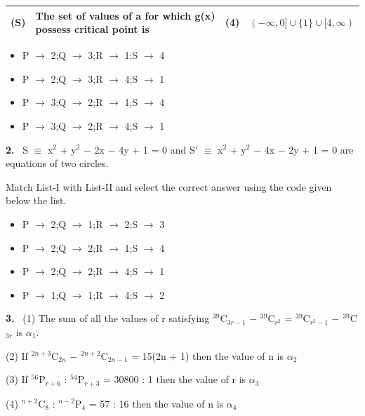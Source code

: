 \documentclass[10pt]{extarticle}
\newcommand{\qn}[1]{\par\smallskip\noindent\textbf{#1.}~}
\newenvironment{qoptions}{\begin{itemize}[leftmargin=1.8em,itemsep=1pt,topsep=2pt,label={}]}{\end{itemize}}
\newcommand{\opt}[2]{\item[(#1)] #2}
\begin{document}
\begin{multicols}{2}
{\begin{tabular}{|L{.7cm}|L{2.6cm}|L{.7cm}|L{2.9cm}|}
(S) & The set of values of a for which g(x) possess critical point is & (4) & $(-\infty, 0] \cup \{1\} \cup [4, \infty)$\\\hline
\end{tabular}}\par
\begin{qoptions}
\opt{A}{P $\to$ 2;Q $\to$ 3;R $\to$ 1;S $\to$ 4}
\opt{B}{P $\to$ 2;Q $\to$ 3;R $\to$ 4;S $\to$ 1}
\opt{C}{P $\to$ 3;Q $\to$ 2;R $\to$ 1;S $\to$ 4}
\opt{D}{P $\to$ 3;Q $\to$ 2;R $\to$ 4;S $\to$ 1}
\end{qoptions}
\qn{2} S $\equiv$ x$^2$ + y$^2$ $-$ 2x $-$ 4y + 1 = 0 and S$'$ $\equiv$ x$^2$ + y$^2$ $-$ 4x $-$ 2y + 1 = 0 are equations of two circles.\par
Match List-I with List-II and select the correct answer using the code given below the list.\par
{}\par
\begin{qoptions}
\opt{A}{P $\to$ 2;Q $\to$ 1;R $\to$ 2;S $\to$ 3}
\opt{B}{P $\to$ 2;Q $\to$ 2;R $\to$ 1;S $\to$ 4}
\opt{C}{P $\to$ 2;Q $\to$ 2;R $\to$ 4;S $\to$ 1}
\opt{D}{P $\to$ 1;Q $\to$ 1;R $\to$ 4;S $\to$ 2}
\end{qoptions}
\qn{3} (1) The sum of all the values of r satisfying $^{39}$C$_{3r-1}$ $-$ $^{39}$C$_{r^2}$ = $^{39}$C$_{r^2-1}$ $-$ $^{39}$C$_{3r}$ is $\alpha_1$.\par
(2) If $^{2n+3}$C$_{2n}$ $-$ $^{2n+2}$C$_{2n-1}$ = 15(2n + 1) then the value of n is $\alpha_2$\par
(3) If $^{56}$P$_{r+6}$ : $^{54}$P$_{r+3}$ = 30800 : 1 then the value of r is $\alpha_3$\par
(4) $^{n+2}$C$_8$ : $^{n-2}$P$_4$ = 57 : 16 then the value of n is $\alpha_4$\par

\end{multicols}
\end{document}
